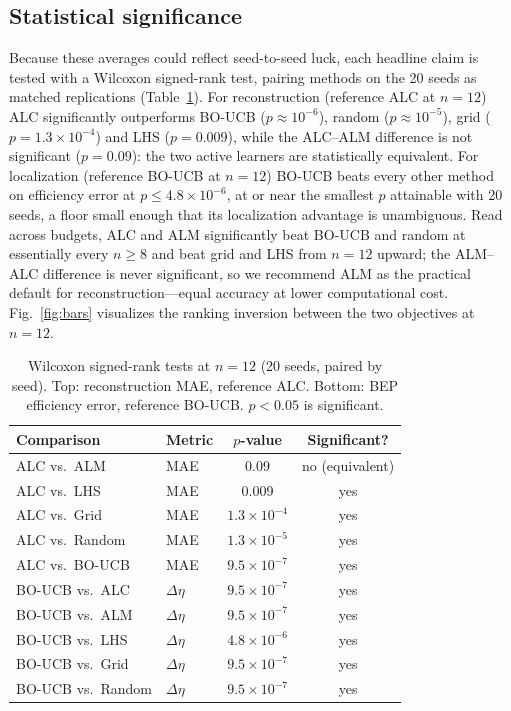 \documentclass[preprint,12pt]{elsarticle}
\begin{document}
\subsection{Statistical significance}\label{sec:sig}
Because these averages could reflect seed-to-seed luck, each headline claim is tested
with a Wilcoxon signed-rank test, pairing methods on the 20 seeds as matched
replications (Table~\ref{tab:wilcoxon}). For reconstruction (reference ALC at
$n = 12$) ALC significantly outperforms BO-UCB ($p \approx 10^{-6}$), random
($p \approx 10^{-5}$), grid ($p = 1.3\times10^{-4}$) and LHS ($p = 0.009$), while the
ALC--ALM difference is not significant ($p = 0.09$): the two active learners are
statistically equivalent. For localization (reference BO-UCB at $n = 12$) BO-UCB beats
every other method on efficiency error at $p \leq 4.8\times10^{-6}$, at or near the
smallest $p$ attainable with 20 seeds, a floor small enough that its localization
advantage is unambiguous. Read across budgets, ALC and ALM significantly beat BO-UCB
and random at essentially every $n \geq 8$ and beat grid and LHS from $n = 12$ upward;
the ALM--ALC difference is never significant, so we recommend ALM as the practical
default for reconstruction---equal accuracy at lower computational cost.
Fig.~\ref{fig:bars} visualizes the ranking inversion between the two objectives at
$n = 12$.

\begin{table}[t]
\centering
\caption{Wilcoxon signed-rank tests at $n = 12$ (20 seeds, paired by seed). Top:
reconstruction MAE, reference ALC. Bottom: BEP efficiency error, reference BO-UCB.
$p < 0.05$ is significant.}
\label{tab:wilcoxon}
\small
\begin{tabular}{@{}llcc@{}}
\toprule
Comparison & Metric & $p$-value & Significant? \\
\midrule
ALC vs.\ ALM     & MAE & 0.09 & no (equivalent) \\
ALC vs.\ LHS     & MAE & 0.009 & yes \\
ALC vs.\ Grid    & MAE & $1.3\times10^{-4}$ & yes \\
ALC vs.\ Random  & MAE & $1.3\times10^{-5}$ & yes \\
ALC vs.\ BO-UCB  & MAE & $9.5\times10^{-7}$ & yes \\
\midrule
BO-UCB vs.\ ALC    & $\Delta\eta$ & $9.5\times10^{-7}$ & yes \\
BO-UCB vs.\ ALM    & $\Delta\eta$ & $9.5\times10^{-7}$ & yes \\
BO-UCB vs.\ LHS    & $\Delta\eta$ & $4.8\times10^{-6}$ & yes \\
BO-UCB vs.\ Grid   & $\Delta\eta$ & $9.5\times10^{-7}$ & yes \\
BO-UCB vs.\ Random & $\Delta\eta$ & $9.5\times10^{-7}$ & yes \\
\bottomrule
\end{tabular}
\end{table}
\end{document}
